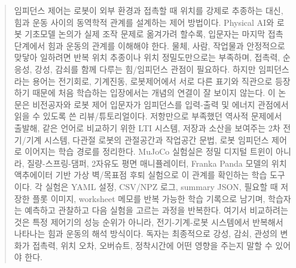 \begin{abstract}
임피던스 제어는 로봇이 외부 환경과 접촉할 때 위치를 강제로 추종하는 대신, 힘과 운동 사이의 동역학적 관계를 설계하는 제어 방법이다.
Physical AI와 로봇 기초모델 논의가 실제 조작 문제로 옮겨가려 할수록, 입문자는 마지막 접촉 단계에서 힘과 운동의 관계를 이해해야 한다.
물체, 사람, 작업물과 안정적으로 맞닿아 일하려면 반복 위치 추종이나 위치 정밀도만으로는 부족하며, 접촉력, 순응성, 강성, 감쇠를 함께 다루는 힘/임피던스 관점이 필요하다.
하지만 임피던스라는 용어는 전기회로, 기계진동, 로봇제어에서 서로 다른 표기와 직관으로 등장하기 때문에 처음 학습하는 입장에서는 개념의 연결이 잘 보이지 않는다.
이 논문은 비전공자와 로봇 제어 입문자가 임피던스를 입력-출력 및 에너지 관점에서 읽을 수 있도록 쓴 리뷰/튜토리얼이다.
저항만으로 부족했던 역사적 문제에서 출발해, 같은 언어로 비교하기 위한 LTI 시스템, 저장과 소산을 보여주는 2차 전기/기계 시스템, 다관절 로봇의 관절공간과 작업공간 문법, 로봇 임피던스 제어로 이어지는 학습 경로를 정리한다.
MuJoCo 실험실은 정밀 디지털 트윈이 아니라, 질량-스프링-댐퍼, 2자유도 평면 매니퓰레이터, Franka Panda 모델의 위치 액추에이터 기반 가상 벽/목표점 후퇴 실험으로 이 관계를 확인하는 학습 도구이다.
각 실험은 YAML 설정, CSV/NPZ 로그, summary JSON, 필요할 때 저장한 플롯 이미지, worksheet 메모를 반복 가능한 학습 기록으로 남기며, 학습자는 예측하고 관찰하고 다음 실험을 고르는 과정을 반복한다.
여기서 비교하려는 것은 특정 제어기의 성능 순위가 아니라, 전기-기계-로봇 시스템에서 반복해서 나타나는 힘과 운동의 해석 방식이다.
독자는 최종적으로 강성, 감쇠, 관성의 변화가 접촉력, 위치 오차, 오버슈트, 정착시간에 어떤 영향을 주는지 말할 수 있어야 한다.
\end{abstract}
